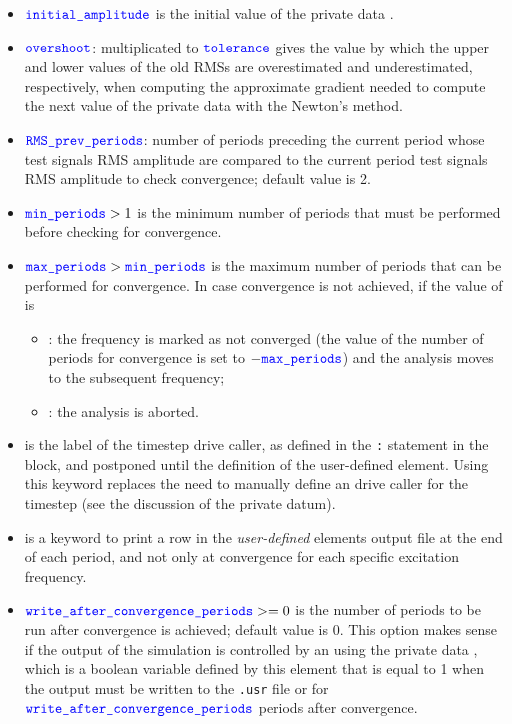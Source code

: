 \begin{itemize}
\item $\textcolor{blue}{\texttt{initial\_amplitude}}$ is the initial value of the private data .

\item $\textcolor{blue}{\texttt{overshoot}}$: multiplicated to $\textcolor{blue}{\texttt{tolerance}}$ gives the value by which the upper and lower values of the old RMSs are overestimated and underestimated, respectively, when computing the approximate gradient needed to compute the next value of the private data  with the Newton's method.

\item $\textcolor{blue}{\texttt{RMS\_prev\_periods}}$: number of periods preceding the current period whose test signals RMS amplitude are compared to the current period test signals RMS amplitude to check convergence; default value is 2.

\item $\textcolor{blue}{\texttt{min\_periods}} > 1$ is the minimum number of periods that must be performed before checking for convergence.

\item $\textcolor{blue}{\texttt{max\_periods}} > \textcolor{blue}{\texttt{min\_periods}}$ is the maximum number of periods that can be performed for convergence.
In case convergence is not achieved, if the value of  is
\begin{itemize}
\item {}: the frequency is marked as not converged
(the value of the number of periods for convergence is set to $-\textcolor{blue}{\texttt{max\_periods}}$) and the analysis moves to the subsequent frequency;

\item {}: the analysis is aborted.
\end{itemize}

\item {} is the label of the timestep drive caller, as defined in the \texttt{:}  statement in the  block, and postponed until the definition of the user-defined element.
Using this keyword replaces the need to manually define an  drive caller for the timestep
(see the discussion of the  private datum).

\item {} is a keyword to print a row in the \emph{user-defined} elements output file at the end of each period, and not only at convergence for each specific excitation frequency.

\item $\textcolor{blue}{\texttt{write\_after\_convergence\_periods}}>=0$ is the number of periods to be run after convergence is achieved; default value is 0.
This option makes sense if the output of the simulation is controlled by an  using the private data ,
 which is a boolean variable defined by this element that is equal to 1 when the output must be written to the \texttt{.usr} file or for $\textcolor{blue}{\texttt{write\_after\_convergence\_periods}}$ periods after convergence.


\end{itemize}
